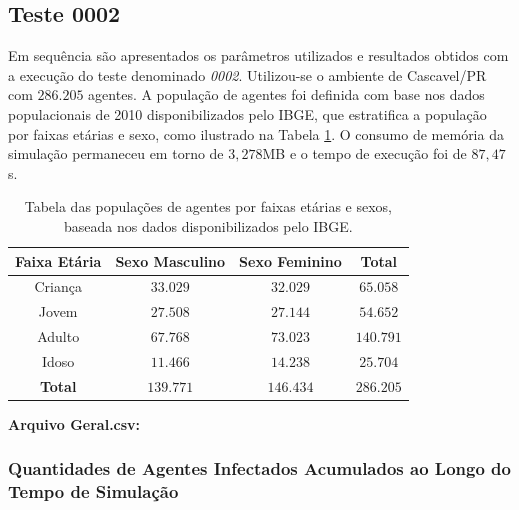 \subsection{Teste 0002}

Em sequência são apresentados os parâmetros utilizados e resultados obtidos com a execução do teste denominado \textit{0002}. Utilizou-se o ambiente de Cascavel/PR com $286.205$ agentes. A população de agentes foi definida com base nos dados populacionais de 2010 disponibilizados pelo IBGE, que estratifica a população por faixas etárias e sexo, como ilustrado na Tabela \ref{tab:populacoes_0002}. O consumo de memória da simulação permaneceu em torno de $3,278$MB e o tempo de execução foi de $87,47$s. \\

\begin{table}[H]
\centering
\begin{tabular}{c|c|c|c}
 \textbf{Faixa Etária} 		& \textbf{Sexo Masculino}	& \textbf{Sexo Feminino}	& \textbf{Total}	\\ \hline
  Criança			& $33.029$			& $32.029$			& $65.058$		\\
  Jovem				& $27.508$			& $27.144$			& $54.652$		\\
  Adulto			& $67.768$			& $73.023$			& $140.791$		\\
  Idoso				& $11.466$			& $14.238$ 			& $25.704$		\\ \hline
  \textbf{Total}		& $139.771$			& $146.434$			& $286.205$		\\
\end{tabular}
\caption{Tabela das populações de agentes por faixas etárias e sexos, baseada nos dados disponibilizados pelo IBGE.}
\label{tab:populacoes_0002}
\end{table}

\newpage

\textbf{Arquivo Geral.csv:} 

\begin{center}
\end{center}

\newpage

\subsubsection{Quantidades de Agentes Infectados Acumulados ao Longo do Tempo de Simulação}

